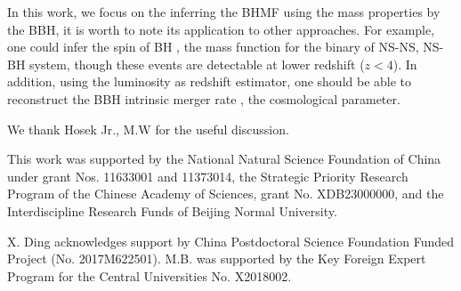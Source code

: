 \documentclass[twocolumn]{aastex62}
\begin{document}
In this work, we focus on the inferring the BHMF using the mass properties by the BBH, it is worth to note its application to other approaches. For example, one could infer the spin of BH \citep{Abbott2018b}, the mass function for the binary of NS-NS, NS-BH system, though these events are detectable at lower redshift ($z<4$). In addition, using the luminosity as redshift estimator, one should be able to reconstruct the BBH intrinsic merger rate \citep{Fishbach2018}, the cosmological parameter.


\acknowledgments
We thank Hosek Jr., M.W for the useful discussion.

This work was supported by the National Natural Science Foundation of China under grant Nos. 11633001 and 11373014, the Strategic Priority Research Program of the Chinese Academy of Sciences, grant No. XDB23000000, and the Interdiscipline Research Funds of Beijing Normal University.

X. Ding acknowledges support by China Postdoctoral Science Foundation Funded Project (No. 2017M622501).
M.B. was supported by the Key Foreign Expert Program for the Central Universities No. X2018002.


%


\end{document}
